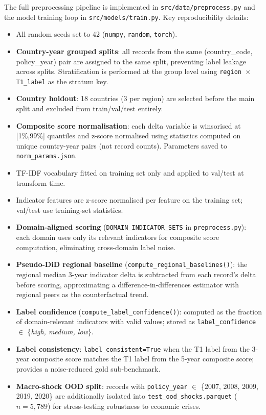 \documentclass[11pt]{article}
\begin{document}
The full preprocessing pipeline is implemented in \texttt{src/data/preprocess.py}
and the model training loop in \texttt{src/models/train.py}. Key reproducibility
details:

\begin{itemize}
\item All random seeds set to 42 (\texttt{numpy}, \texttt{random}, \texttt{torch}).
\item \textbf{Country-year grouped splits}: all records from the same
      (country\_code, policy\_year) pair are assigned to the same split,
      preventing label leakage across splits. Stratification is performed at
      the group level using \texttt{region $\times$ T1\_label} as the stratum key.
\item \textbf{Country holdout}: 18 countries (3 per region) are selected before
      the main split and excluded from train/val/test entirely.
\item \textbf{Composite score normalisation}: each delta variable is winsorised
      at [1\%,99\%] quantiles and z-score normalised using statistics computed
      on unique country-year pairs (not record counts). Parameters saved to
      \texttt{norm\_params.json}.
\item TF-IDF vocabulary fitted on training set only and applied to
      val/test at transform time.
\item Indicator features are z-score normalised per feature on the training set;
      val/test use training-set statistics.
\item \textbf{Domain-aligned scoring} (\texttt{DOMAIN\_INDICATOR\_SETS} in
      \texttt{preprocess.py}): each domain uses only its relevant indicators
      for composite score computation, eliminating cross-domain label noise.
\item \textbf{Pseudo-DiD regional baseline} (\texttt{compute\_regional\_baselines()}):
      the regional median 3-year indicator delta is subtracted from each record's
      delta before scoring, approximating a difference-in-differences estimator
      with regional peers as the counterfactual trend.
\item \textbf{Label confidence} (\texttt{compute\_label\_confidence()}): computed as
      the fraction of domain-relevant indicators with valid values; stored as
      \texttt{label\_confidence} $\in$ \{\textit{high, medium, low}\}.
\item \textbf{Label consistency}: \texttt{label\_consistent=True} when the T1 label
      from the 3-year composite score matches the T1 label from the 5-year composite
      score; provides a noise-reduced gold sub-benchmark.
\item \textbf{Macro-shock OOD split}: records with \texttt{policy\_year} $\in$
      \{2007, 2008, 2009, 2019, 2020\} are additionally isolated into
      \texttt{test\_ood\_shocks.parquet} ($n=5{,}789$) for stress-testing robustness to economic crises.
\end{itemize}
\end{document}
